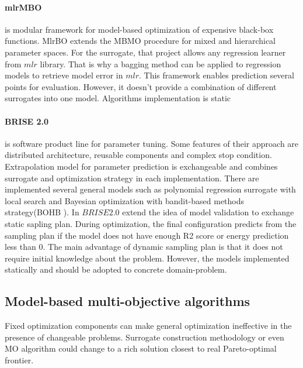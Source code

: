         \paragraph{mlrMBO}\cite{BischlmlrMBO} is modular framework for model-based optimization of expensive black-box functions. MlrBO extends the MBMO procedure for mixed and hierarchical parameter spaces. For the surrogate, that project allows any regression learner from $mlr$ library. That is why a bagging method can be applied to regression models to retrieve model error in $mlr$. This framework enables prediction several points for evaluation. However, it doesn't provide a combination of different surrogates into one model. Algorithms implementation is static
       

        \paragraph{BRISE 2.0} \cite{PukhkaievG18} is software product line for parameter tuning. Some features of their approach are distributed architecture, reusable components and complex stop condition. Extrapolation model for parameter prediction is exchangeable and combines surrogate and optimization strategy in each implementation. There are implemented several general models such as polynomial regression surrogate with local search and Bayesian optimization with bandit-based methods strategy(BOHB \cite{FalknerBOHB}). In $BRISE 2.0$ extend the idea of model validation to exchange static sapling plan. During optimization, the final configuration predicts from the sampling plan if the model does not have enough R2 score or energy prediction less than 0. The main advantage of dynamic sampling plan is that it does not require initial knowledge about the problem. However, the models implemented statically and should be adopted to concrete domain-problem.



    \subsection{Model-based multi-objective algorithms}
        Fixed optimization components can make general optimization ineffective in the presence of changeable problems. Surrogate construction methodology or even MO algorithm could change to a rich solution closest to real Pareto-optimal frontier.

